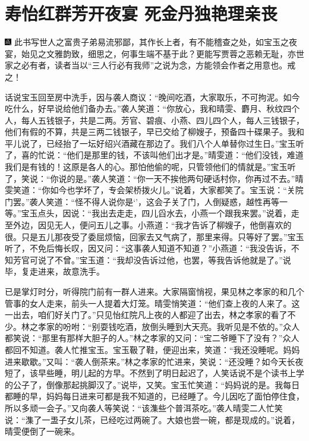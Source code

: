 

\chapter{寿怡红群芳开夜宴 死金丹独艳理亲丧}

{\includegraphics[width=3mm]{../Images/00005} \kaishu 此书写世人之富贵子弟易流邪鄙，其作长上者，有不能稽查之处，如宝玉之夜宴，始见之文雅韵致，细思之，何事生端不基于此？更能写贾蓉之恶赖无耻，亦世家之必有者，读者当以``三人行必有我师''之说为念，方能领会作者之用意也。戒之！}

话说宝玉回至房中洗手，因与袭人商议：``晚间吃酒，大家取乐，不可拘泥。如今吃什么，好早说给他们备办去。''袭人笑道：``你放心，我和晴雯、麝月、秋纹四个人，每人五钱银子，共是二两。芳官、碧痕、小燕、四儿四个人，每人三钱银子，他们有假的不算，共是三两二钱银子，早已交给了柳嫂子，预备四十碟果子。我和平儿说了，已经抬了一坛好绍兴酒藏在那边了。我们八个人单替你过生日。''宝玉听了，喜的忙说：``他们是那里的钱，不该叫他们出才是。''晴雯道：``他们没钱，难道我们是有钱的！这原是各人的心。那怕他偷的呢，只管领他们的情就是。''宝玉听了，笑说：``你说的是。''袭人笑道：``你一天不挨他两句硬话村你，你再过不去。''晴雯笑道：``你如今也学坏了，专会架桥拨火儿。''说着，大家都笑了。宝玉说：``关院门罢。''袭人笑道：``怪不得人说你是`'，这会子关了门，人倒疑惑，越性再等一等。''宝玉点头，因说：``我出去走走，四儿舀水去，小燕一个跟我来罢。''说着，走至外边，因见无人，便问五儿之事。小燕道：``我才告诉了柳嫂子，他倒喜欢的很。只是五儿那夜受了委屈烦恼，回家去又气病了，那里来得。只等好了罢。''宝玉听了，不免后悔长叹，因又问：``这事袭人知道不知道？''小燕道：``我没告诉，不知芳官可说了不曾。''宝玉道：``我却没告诉过他，也罢，等我告诉他就是了。''说毕，复走进来，故意洗手。

已是掌灯时分，听得院门前有一群人进来。大家隔窗悄视，果见林之孝家的和几个管事的女人走来，前头一人提着大灯笼。晴雯悄笑道：``他们查上夜的人来了。这一出去，咱们好关门了。''只见怡红院凡上夜的人都迎了出去，林之孝家的看了不少。林之孝家的吩咐：``别耍钱吃酒，放倒头睡到大天亮。我听见是不依的。''众人都笑说：``那里有那样大胆子的人。''林之孝家的又问：``宝二爷睡下了没有？''众人都回不知道。袭人忙推宝玉。宝玉靸了鞋，便迎出来，笑道：``我还没睡呢。妈妈进来歇歇。''又叫：``袭人倒茶来。''林之孝家的忙进来，笑说：``还没睡？如今天长夜短了，该早些睡，明儿起的方早。不然到了明日起迟了，人笑话说不是个读书上学的公子了，倒像那起挑脚汉了。''说毕，又笑。宝玉忙笑道：``妈妈说的是。我每日都睡的早，妈妈每日进来可都是我不知道的，已经睡了。今儿因吃了面怕停住食，所以多顽一会子。''又向袭人等笑说：``该潗些个普洱茶吃。''袭人晴雯二人忙笑说：``潗了一盄子女儿茶，已经吃过两碗了。大娘也尝一碗，都是现成的。''说着，晴雯便倒了一碗来。

